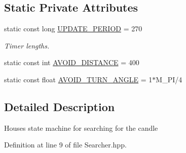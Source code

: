 \subsection*{Static Private Attributes}
\begin{DoxyCompactItemize}
\item 
static const long \hyperlink{classSearcher_af4dd5850dbe46a9a76605ad4ba454066}{U\-P\-D\-A\-T\-E\-\_\-\-P\-E\-R\-I\-O\-D} = 270
\begin{DoxyCompactList}\small\item\em Timer lengths. \end{DoxyCompactList}\item 
static const int \hyperlink{classSearcher_ae0cc94f0e90c705ee21da7abf58fcc22}{A\-V\-O\-I\-D\-\_\-\-D\-I\-S\-T\-A\-N\-C\-E} = 400
\item 
static const float \hyperlink{classSearcher_afbe5b3bf208f18f77a3dcdb0aa86a96c}{A\-V\-O\-I\-D\-\_\-\-T\-U\-R\-N\-\_\-\-A\-N\-G\-L\-E} = 1$\ast$M\-\_\-\-P\-I/4
\end{DoxyCompactItemize}


\subsection{Detailed Description}
Houses state machine for searching for the candle 

Definition at line 9 of file Searcher.\-hpp.



